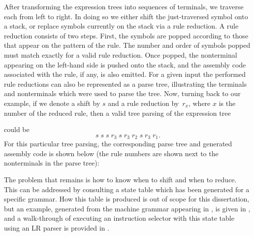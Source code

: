 {After transforming the \glspl{expression tree} into sequences of
\glspl{terminal}, we traverse each from left to right.
%
In doing so we either \gls{shift} the just-traversed \gls{symbol} onto a stack,
or replace \glspl{symbol} currently on the stack via a \gls{rule reduction}.
%
A \gls{rule reduction} consists of two steps.
%
First, the \glspl{symbol} are popped according to those that appear on the
\gls{pattern} of the \gls{rule}.
%
The number and order of \glspl{symbol} popped must match exactly for a valid
\gls{rule reduction}.
%
Once popped, the \gls{nonterminal} appearing on the left-hand side is pushed
onto the stack, and the \gls{assembly code} associated with the \gls{rule}, if
any, is also emitted.
%
For a given input the performed \glspl{rule reduction} can also be represented
as a \gls{parse tree}, illustrating the \glspl{terminal} and \glspl{nonterminal}
which were used to parse the \gls{tree}.
%
Now, turning back to our example, if we denote a \gls{shift} by $s$ and a
\gls{rule reduction} by~$r_x$, where $x$ is the number of the reduced
\gls{rule}, then a valid \gls{tree parsing} of the \gls{expression tree}
\begin{center}
\end{center}
could be
%
\begin{displaymath}
 s \; s \; s \; r_3 \; s \; r_3 \; r_2 \; s \; r_3 \; r_1.
\end{displaymath}
%
For this particular \gls{tree parsing}, the corresponding \gls{parse tree} and
generated \gls{assembly code} is shown below (the \gls{rule} numbers are shown
next to the \glspl{nonterminal} in the \gls{parse tree}):
%
%    

The problem that remains is how to know when to \gls{shift} and when to reduce.
%
This can be addressed by consulting a state table which has been
generated for a specific \gls{grammar}.
%
How this table is produced is out of scope for this dissertation, but an
example, generated from the \gls{machine grammar} appearing in
, is given in
, and a walk-through of executing an
\gls{instruction selector} with this state table using an \gls{LR parser} is
provided in .

}
